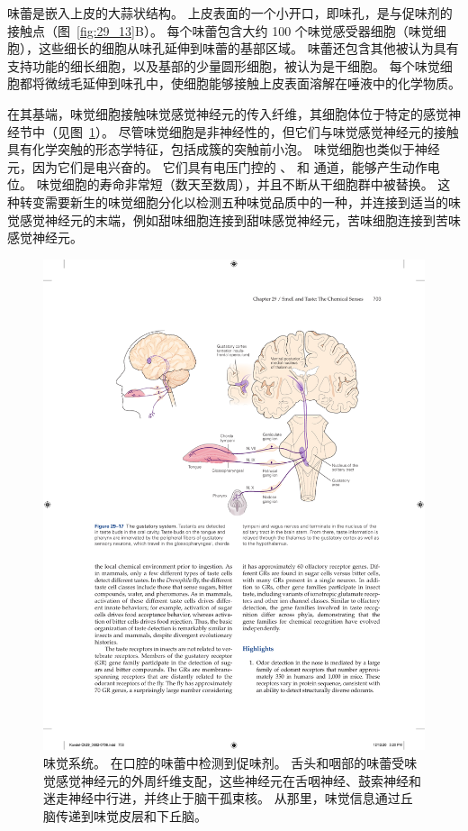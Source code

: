 味蕾是嵌入上皮的大蒜状结构。
上皮表面的一个小开口，即味孔，是与促味剂的接触点（图~\ref{fig:29_13}B）。
每个味蕾包含大约 100 个味觉感受器细胞（味觉细胞），这些细长的细胞从味孔延伸到味蕾的基部区域。
味蕾还包含其他被认为具有支持功能的细长细胞，以及基部的少量圆形细胞，被认为是干细胞。
每个味觉细胞都将微绒毛延伸到味孔中，使细胞能够接触上皮表面溶解在唾液中的化学物质。


在其基端，味觉细胞接触味觉感觉神经元的传入纤维，其细胞体位于特定的感觉神经节中（见图~\ref{fig:29_17}）。
尽管味觉细胞是非神经性的，但它们与味觉感觉神经元的接触具有化学突触的形态学特征，包括成簇的突触前小泡。
味觉细胞也类似于神经元，因为它们是电兴奋的。
它们具有电压门控的 、 和  通道，能够产生动作电位。
味觉细胞的寿命非常短（数天至数周），并且不断从干细胞群中被替换。
这种转变需要新生的味觉细胞分化以检测五种味觉品质中的一种，并连接到适当的味觉感觉神经元的末端，例如甜味细胞连接到甜味感觉神经元，苦味细胞连接到苦味感觉神经元。


\begin{figure}[htbp]
	\centering
	\includegraphics[width=0.75\linewidth]{chap29/fig_29_17}
	\caption{味觉系统。 在口腔的味蕾中检测到促味剂。
		舌头和咽部的味蕾受味觉感觉神经元的外周纤维支配，这些神经元在舌咽神经、鼓索神经和迷走神经中行进，并终止于脑干孤束核。
		从那里，味觉信息通过丘脑传递到味觉皮层和下丘脑。}
	\label{fig:29_17}
\end{figure}



